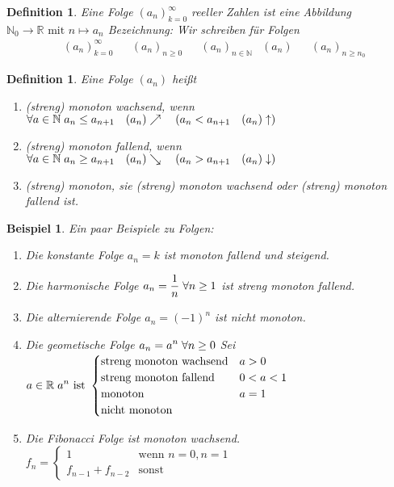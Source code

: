\documentclass[a4paper,titlepage,oneside]{article}
\def\N{\ensuremath{\mathbb{N}} }
\def\R{\ensuremath{\mathbb{R}} }
\def\fa{\ensuremath{\forall}}
\def\sp{\hspace{0,1cm}}
\theoremstyle{thmstyle}
\newtheorem{defi}[satz]{Definition}
\newtheorem{bsp}[satz]{Beispiel}
\begin{document}
\begin{defi}
Eine Folge $(a_n)_{k=0}^{\infty}$ reeller Zahlen ist eine Abbildung $\N_0 \rightarrow \R\text{ mit } n \mapsto a_n$ 
Bezeichnung: Wir schreiben für Folgen
\begin{align*}
&(a_n)_{k=0}^{\infty} && (a_n)_{n\ge0} && (a_n)_{n\in\N} & (a_n) && (a_n)_{n\ge n_0} 
\end{align*}
\end{defi}

\newpage
\begin{defi}
Eine Folge \((a_n)\) heißt 
\begin{enumerate}
\item (streng) monoton wachsend, wenn \( \fa a \in \N \sp a_n \le a_{n+1}	\quad (a_n)\nearrow	\quad (a_n < a_{n+1} \quad (a_n)\uparrow)\)
\item (streng) monoton fallend, wenn \( \fa a \in \N \sp a_n \ge a_{n+1}	\quad (a_n)\searrow	\quad (a_n > a_{n+1} \quad (a_n)\downarrow)\)
\item (streng) monoton, sie (streng) monoton wachsend oder (streng) monoton fallend ist.
\end{enumerate}
\end{defi}

\begin{bsp}
Ein paar Beispiele zu Folgen:
\begin{enumerate}[label=(\arabic*)]
\item Die konstante Folge \(a_n = k\) ist monoton fallend und steigend.
\item Die harmonische Folge $ \displaystyle a_n = \frac{1}{n} \sp \fa n \ge 1$ ist streng monoton fallend.
\item Die alternierende Folge $ \displaystyle a_n = (-1)^n $ ist nicht monoton.
\item Die geometische Folge $ \displaystyle  a_n = a^n \sp \fa n \ge 0 $ Sei $ \displaystyle a \in \R \sp a^n \text{ ist } 
				\begin{cases}			\text{streng monoton wachsend} 	& a > 0\\
									\text{streng monoton fallend} 		& 0 < a < 1\\
									\text{monoton} 					& a = 1\\
									\text{nicht monoton} 				&  \end{cases} $
\item Die Fibonacci Folge ist monoton wachsend. $ \displaystyle f_n = \begin{cases}	1				& \text{wenn } n = 0, n = 1\\
																f_{n-1} + f_{n-2}	& \text{sonst} \end{cases} $
\end{enumerate}
\end{bsp}
\end{document}
